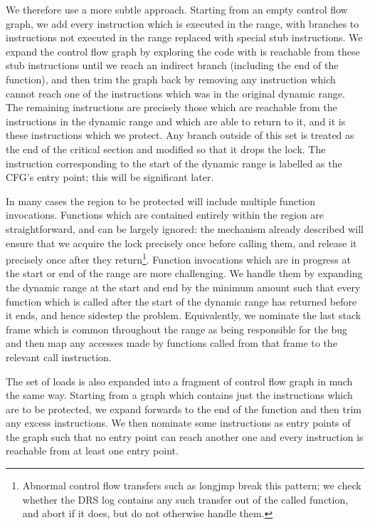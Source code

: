 \documentclass[10pt,letter,twocolumn]{sigplanconf}
\begin{document}
We therefore use a more subtle approach.  Starting from an empty
control flow graph, we add every instruction which is executed in the
range, with branches to instructions not executed in the range
replaced with special stub instructions.  We expand the control flow
graph by exploring the code with is reachable from these stub
instructions until we reach an indirect branch (including the end of
the function), and then trim the graph back by removing any
instruction which cannot reach one of the instructions which was in
the original dynamic range.  The remaining instructions are precisely
those which are reachable from the instructions in the dynamic range
and which are able to return to it, and it is these instructions which
we protect.  Any branch outside of this set is treated as the end of
the critical section and modified so that it drops the lock.  The
instruction corresponding to the start of the dynamic range is
labelled as the CFG's entry point; this will be significant later.

In many cases the region to be protected will include multiple
function invocations.  Functions which are contained entirely within
the region are straightforward, and can be largely ignored: the
mechanism already described will ensure that we acquire the lock
precisely once before calling them, and release it precisely once
after they return\footnote{Abnormal control flow transfers such as
  longjmp break this pattern; we check whether the DRS log contains
  any such transfer out of the called function, and abort if it does,
  but do not otherwise handle them.}.  Function invocations which are
in progress at the start or end of the range are more challenging.  We
handle them by expanding the dynamic range at the start and end by the
minimum amount such that every function which is called after the
start of the dynamic range has returned before it ends, and hence
sidestep the problem.  Equivalently, we nominate the last stack frame
which is common throughout the range as being responsible for the bug
and then map any accesses made by functions called from that frame to
the relevant call instruction.

The set of loads is also expanded into a fragment of control flow
graph in much the same way.  Starting from a graph which contains just
the instructions which are to be protected, we expand forwards to the
end of the function and then trim any excess instructions.  We then
nominate some instructions as entry points of the graph such that no
entry point can reach another one and every instruction is reachable
from at least one entry point.
\end{document}
